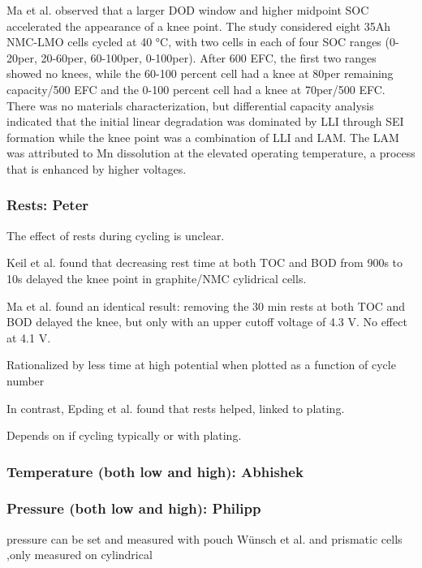 \documentclass{article}
\begin{document}
Ma et al. \cite{ma_novel_2019} observed that a larger DOD window and higher midpoint SOC accelerated the appearance of a knee point. The study considered eight 35Ah NMC-LMO cells cycled at 40 °C, with two cells in each of four SOC ranges (0-20per, 20-60per, 60-100per, 0-100per). After 600 EFC, the first two ranges showed no knees, while the 60-100 percent cell had a knee at 80per remaining capacity/500 EFC and the 0-100 percent cell had a knee at 70per/500 EFC. There was no materials characterization, but differential capacity analysis indicated that the initial linear degradation was dominated by LLI through SEI formation while the knee point was a combination of LLI and LAM. The LAM was attributed to Mn dissolution at the elevated operating temperature, a process that is enhanced by higher voltages. 

\subsubsection{Rests: Peter}

The effect of rests during cycling is unclear.

Keil et al.\cite{keil_linear_2019} found that decreasing rest time at both TOC and BOD from 900s to 10s delayed the knee point in graphite/NMC cylidrical cells.

Ma et al.\cite{ma_editors_2019} found an identical result: removing the 30 min rests at both TOC and BOD delayed the knee, but only with an upper cutoff voltage of 4.3 V. No effect at 4.1 V.

Rationalized by less time at high potential when plotted as a function of cycle number

In contrast, Epding et al.\cite{epding_investigation_2019} found that rests helped, linked to plating.

Depends on if cycling typically or with plating.

\subsubsection{Temperature (both low and high): Abhishek}
\subsubsection{Pressure (both low and high): Philipp}

pressure can be set and measured with pouch Wünsch et al. and prismatic cells\cite{cannarella_stress_2014} ,only measured on cylindrical \cite{willenberg_high-precision_2020}
\end{document}

